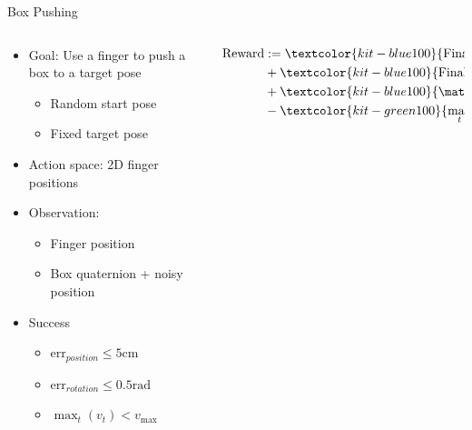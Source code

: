 \documentclass[16:9,en,navbarinfooter]{sdqbeamer}
\begin{document}
\begin{frame}{Box Pushing}

\begin{columns}[t]
    \begin{column}{0.4\textwidth}
        \vspace{1cm}
        \begin{itemize}
            \item Goal: Use a finger to push a box to a target pose
                \begin{itemize}
                    \item Random start pose
                    \item Fixed target pose
                \end{itemize}
            \item Action space: 2D finger positions
            \item Observation:
                \begin{itemize}
                    \item Finger position
                    \item Box quaternion + noisy position
                \end{itemize}
            \item Success
                \begin{itemize}
                \item $\text{err}_{position} \leq 5 \text{cm}$
                \item $\text{err}_{rotation} \leq 0.5 \text{rad}$
                \item $\max_t(v_t) < v_\text{max}$
                \end{itemize}
        \end{itemize}
            \vspace{1em}
    \end{column}
    \begin{column}{0.5\textwidth}
        \vspace{.5cm}
        \[
        \begin{aligned}
            \text{Reward} &:= \textcolor{kit-blue100}{\text{Final Euclidean Distance}} \\
             &+  \textcolor{kit-blue100}{\text{Final Rotational Distance}} \\
             &+  \textcolor{kit-blue100}{\mathds{1} \left\{\text{success}\right\} } \\
             &-  \textcolor{kit-green100}{\max_t\  \text{step}(v_t)} \\

\end{aligned}\]
\end{column}
\end{columns}
\end{frame}
\end{document}
